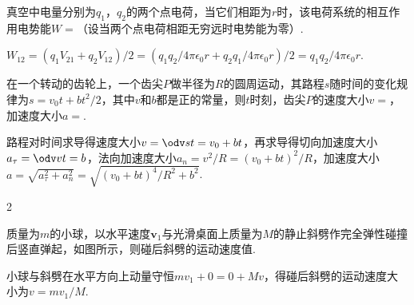 \begin{problem}
    真空中电量分别为$q_1$，$q_2$的两个点电荷，当它们相距为$r$时，该电荷系统的相互作用电势能$W=$（设当两个点电荷相距无穷远时电势能为零）.
\end{problem}
\begin{solution}
    $W_{12}=(q_1V_{21}+q_2V_{12})/2=(q_1q_2/4\pi\epsilon_0r+q_2q_1/4\pi\epsilon_0r)/2=q_1q_2/4\pi\epsilon_0r$.
\end{solution}

\begin{problem}
    在一个转动的齿轮上，一个齿尖$P$做半径为$R$的圆周运动，其路程$s$随时间的变化规律为$s=v_0t+bt^2/2$，其中$v$和$b$都是正的常量，则$t$时刻，齿尖$P$的速度大小$v=$，加速度大小$a=$.
\end{problem}
\begin{solution}
    路程对时间求导得速度大小$v=\odv st=v_0+bt$，再求导得切向加速度大小$a_\tau=\odv vt=b$，法向加速度大小$a_n=v^2/R=(v_0+bt)^2/R$，加速度大小$a=\sqrt{a_\tau^2+a_n^2}=\sqrt{(v_0+bt)^4/R^2+b^2}$.
\end{solution}

\begin{paracol}{2}
\begin{problem}
    质量为$m$的小球，以水平速度$\bm v_1$与光滑桌面上质量为$M$的静止斜劈作完全弹性碰撞后竖直弹起，如图所示，则碰后斜劈的运动速度值.
    \switchcolumn\vspace*{\fill}\centering
    \vspace*{\fill}
\end{problem}\switchcolumn
{}
\begin{solution}
    小球与斜劈在水平方向上动量守恒$mv_1+0=0+Mv$，得碰后斜劈的运动速度大小为$v=mv_1/M$.
\end{solution}
\end{paracol}

